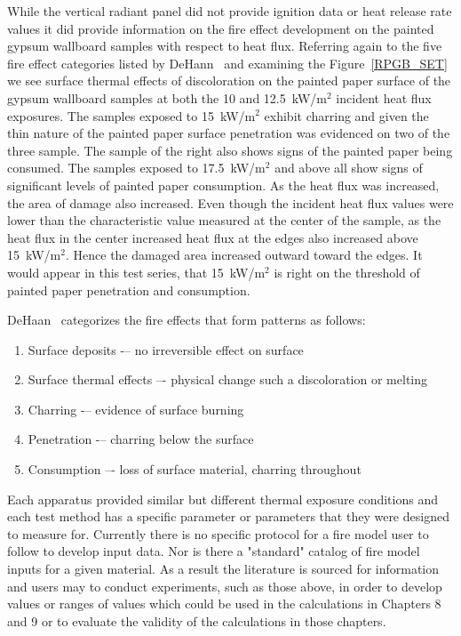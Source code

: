 \documentclass[twoside]{uocthesis}
\begin{document}
While the vertical radiant panel did not provide ignition data or heat release rate values it did provide information on the fire effect development on the painted gypsum wallboard samples with respect to heat flux.  Referring again to the five fire effect categories listed by DeHann~\cite{DeHaan:2012} and examining the Figure~\ref{RPGB_SET} we see surface thermal effects of discoloration on the painted paper surface of the gypsum wallboard samples at both the 10 and 12.5~kW/m$^2$ incident heat flux exposures.  The samples exposed to 15~kW/m$^2$ exhibit charring and given the thin nature of the painted paper surface penetration was evidenced on two of the three sample.  The sample of the right also shows signs of the painted paper being consumed.  The samples exposed to 17.5~kW/m$^2$ and above all show signs of significant levels of painted paper consumption.  As the heat flux was increased, the area of damage also increased. Even though the incident heat flux values were lower than the characteristic value measured at the center of the sample, as the heat flux in the center increased heat flux at the edges also increased above 15~kW/m$^2$. Hence the damaged area increased outward toward the edges. It would appear in this test series, that 15~kW/m$^2$ is right on the threshold of painted paper penetration and consumption.             


DeHaan~\cite{DeHaan:2012} categorizes the fire effects that form patterns as follows:
\begin{enumerate}
	\item Surface deposits -– no irreversible effect on surface
	\item Surface thermal effects –- physical change such a discoloration or melting
	\item Charring -– evidence of surface burning
	\item Penetration -– charring below the surface
	\item Consumption –- loss of surface material, charring throughout
\end{enumerate}

Each apparatus provided similar but different thermal exposure conditions and each test method has a specific parameter or parameters that they were designed to measure for. Currently there is no specific protocol for a fire model user to follow to develop input data.  Nor is there a "standard" catalog of fire model inputs for a given material.  As a result the literature is sourced for information and users may to conduct experiments, such as those above, in order to develop values or ranges of values which could be used in the calculations in Chapters 8 and 9 or to evaluate the validity of the calculations in those chapters.     
\end{document}
